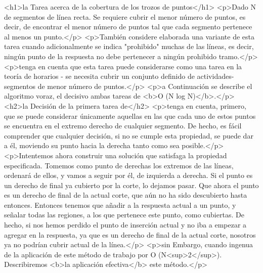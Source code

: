 <h1>la Tarea acerca de la cobertura de los trozos de puntos</h1>
<p>Dado N de segmentos de línea recta. Se requiere cubrir el menor número de puntos, es decir, de encontrar el menor número de puntos tal que cada segmento pertenece al menos un punto.</p>
<p>También considere elaborada una variante de esta tarea cuando adicionalmente se indica "prohibido" muchas de las líneas, es decir, ningún punto de la respuesta no debe pertenecer a ningún prohibido tramo.</p>
<p>tenga en cuenta que esta tarea puede considerarse como una tarea en la teoría de horarios - se necesita cubrir un conjunto definido de actividades-segmentos de menor número de puntos.</p>
<p>a Continuación se describe el algoritmo voraz, el decisivo ambas tareas de <b>O (N log N)</b>.</p>
<h2>la Decisión de la primera tarea de</h2>
<p>tenga en cuenta, primero, que se puede considerar únicamente aquellas en las que cada uno de estos puntos se encuentra en el extremo derecho de cualquier segmento. De hecho, es fácil comprender que cualquier decisión, si no se cumple esta propiedad, se puede dar a él, moviendo su punto hacia la derecha tanto como sea posible.</p>
<p>Intentemos ahora construir una solución que satisfaga la propiedad especificada. Tomemos como punto de derechas los extremos de las líneas, ordenará de ellos, y vamos a seguir por él, de izquierda a derecha. Si el punto es un derecho de final ya cubierto por la corte, lo dejamos pasar. Que ahora el punto es un derecho de final de la actual corte, que aún no ha sido descubierto hasta entonces. Entonces tenemos que añadir a la respuesta actual a un punto, y señalar todas las regiones, a los que pertenece este punto, como cubiertas. De hecho, si nos hemos perdido el punto de inserción actual y no iba a empezar a agregar en la respuesta, ya que es un derecho de final de la actual corte, nosotros ya no podrían cubrir actual de la línea.</p>
<p>sin Embargo, cuando ingenua de la aplicación de este método de trabajo por O (N<sup>2</sup>). Describiremos <b>la aplicación efectiva</b> este método.</p>
